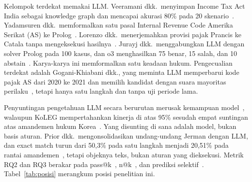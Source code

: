 \documentclass[conference]{IEEEtran}
\makeatletter
\DeclareRobustCommand{\en}[1]{{\usefont{\f@encoding}{\f@family}{\f@series}{it}#1\/}}
\makeatother
\begin{document}
Kelompok terdekat memakai LLM. Veeramani dkk.\ menyimpan \en{Income Tax Act} India sebagai \en{knowledge graph} dan mencapai akurasi 80\% pada 20 skenario~\cite{veeramani2026neurosymbolic}. Yadamsuren dkk.\ memformalkan satu pasal \en{Internal Revenue Code} Amerika Serikat (AS) ke Prolog~\cite{yadamsuren2026formalization}. Lorenzo dkk.\ menerjemahkan provisi pajak Prancis ke Catala tanpa mengeksekusi hasilnya~\cite{lorenzo2025translating}. Jurayj dkk.\ menggabungkan LLM dengan \en{solver} Prolog pada 100 kasus, dan o3 menghasilkan 75 benar, 15 salah, dan 10 \en{abstain}~\cite{jurayj2026tax}. Karya-karya ini memformalkan satu keadaan hukum. Pengecualian terdekat adalah Gogani-Khiabani dkk., yang meminta LLM memperbarui kode pajak AS dari 2020 ke 2021 dan memilih kandidat dengan suara mayoritas perilaku~\cite{goganikhiabani2025maintaining}, tetapi hanya satu langkah dan tanpa uji periode lama.

Penyuntingan pengetahuan LLM secara berurutan merusak kemampuan model~\cite{gupta2024editing}, walaupun KoLEG mempertahankan kinerja di atas 95\% sesudah empat suntingan atas amandemen hukum Korea~\cite{seo2025koleg}. Yang disunting di sana adalah model, bukan basis aturan. Prior dkk.\ mengonsolidasikan undang-undang Jerman dengan LLM, dan \en{exact match} turun dari 50,3\% pada satu langkah menjadi 20,51\% pada rantai amandemen~\cite{prior2025risks}, tetapi objeknya teks, bukan aturan yang dieksekusi. Metrik RQ2 dan RQ3 berakar pada \en{pass@k}~\cite{chen2021evaluating}, \en{n@k}~\cite{li2022alphacode}, dan prediksi selektif~\cite{xin2021abstention}. Tabel~\ref{tab:posisi} merangkum posisi penelitian ini.
\end{document}
